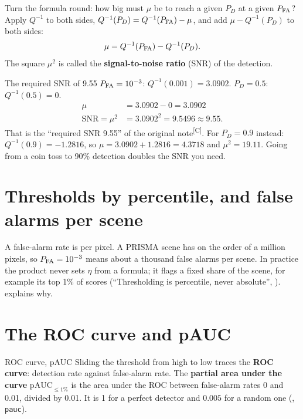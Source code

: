 \documentclass[11pt,a4paper,oneside,openany]{book}
\newcommand{\comp}{\textsuperscript{\textsf{\scriptsize[C]}}}
\begin{document}
Turn the formula round: how big must $\mu$ be to reach a given $P_D$ at a given $P_{\rm FA}$? Apply $Q^{-1}$ to both sides,
$Q^{-1}(P_D)=Q^{-1}(P_{\rm FA})-\mu$, and add $\mu-Q^{-1}(P_D)$ to both sides:
\[
  \mu=Q^{-1}(P_{\rm FA})-Q^{-1}(P_D).
\]
The square $\mu^2$ is called the \textbf{signal-to-noise ratio} (SNR) of the detection.

\begin{worked}[label=we:reqsnr]{The required SNR of 9.55}
$P_{\rm FA}=10^{-3}$: $Q^{-1}(0.001)=3.0902$. $P_D=0.5$: $Q^{-1}(0.5)=0$.
\begin{align*}
\mu &= 3.0902-0=3.0902\\
\text{SNR}=\mu^2 &= 3.0902^2=9.5496\approx9.55 .
\end{align*}
That is the ``required SNR 9.55'' of the original note\comp. For $P_D=0.9$ instead: $Q^{-1}(0.9)=-1.2816$, so
$\mu=3.0902+1.2816=4.3718$ and $\mu^2=19.11$. Going from a coin toss to 90\% detection doubles the SNR you need.
\end{worked}

\section{Thresholds by percentile, and false alarms per scene}

A false-alarm rate is per pixel. A PRISMA scene has on the order of a million pixels, so $P_{\rm FA}=10^{-3}$ means about a
thousand false alarms per scene. In practice the product never sets $\eta$ from a formula; it flags a fixed share of the scene,
for example its top 1\% of scores (``Thresholding is percentile, never absolute'', ).
 explains why.

\section{The ROC curve and pAUC}

\begin{defn}{ROC curve, pAUC}
Sliding the threshold from high to low traces the \textbf{ROC curve}: detection rate against false-alarm rate. The \textbf{partial
area under the curve} $\text{pAUC}_{\le1\%}$ is the area under the ROC between false-alarm rates 0 and 0.01, divided by 0.01. It
is 1 for a perfect detector and $0.005$ for a random one (, \texttt{pauc}).
\end{defn}
\end{document}
